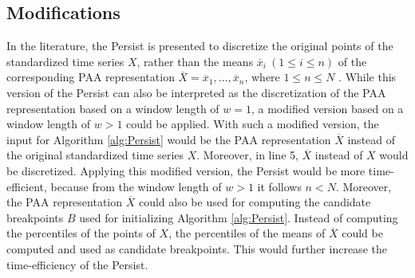 \subsection*{Modifications}
In the literature, the Persist is presented to discretize the original points of the standardized time series $X$, rather than the means $\overline{x}_i \ (1 \leq i \leq n)$ of the corresponding \ac{PAA} representation $\overline{X} = \overline{x}_1, ..., \overline{x}_n$, where $1 \leq n \leq N$ \cite{Persist}. While this version of the Persist can also be interpreted as the discretization of the \ac{PAA} representation based on a window length of $w = 1$, a modified version based on a window length of $w > 1$ could be applied. \newline
With such a modified version, the input for Algorithm \ref{alg:Persist} would be the \ac{PAA} representation $\overline{X}$ instead of the original standardized time series $X$. Moreover, in line 5, $\overline{X}$ instead of $X$ would be discretized. Applying this modified version, the Persist would be more time-efficient, because from the window length of $w > 1$ it follows $n < N$. \newline
Moreover, the \ac{PAA} representation $\overline{X}$ could also be used for computing the candidate breakpoints $B$ used for initializing Algorithm \ref{alg:Persist}. Instead of computing the percentiles of the points of $X$, the percentiles of the means of $\overline{X}$ could be computed and used as candidate breakpoints. This would further increase the time-efficiency of the Persist.
